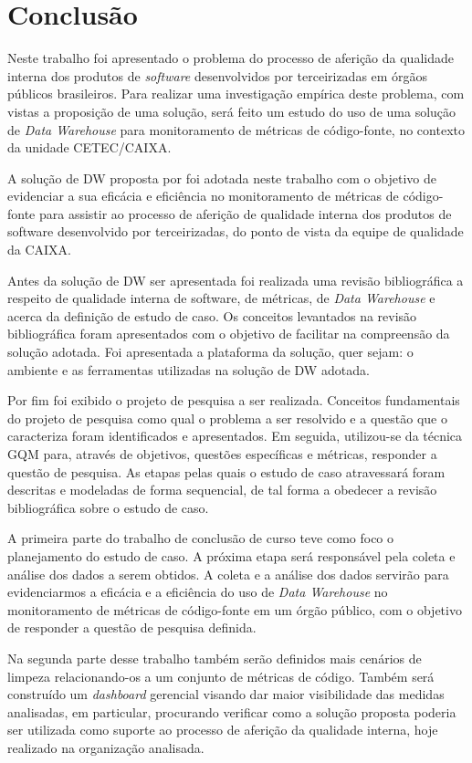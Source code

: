 \chapter{Conclusão}

Neste trabalho foi apresentado o problema do processo de aferição da qualidade interna dos produtos de \textit{software} desenvolvidos por terceirizadas em órgãos públicos brasileiros. Para realizar uma investigação empírica deste problema, com vistas a proposição de uma solução, será feito um estudo do uso de uma solução de \textit{Data Warehouse} para monitoramento de métricas de código-fonte, no contexto da unidade CETEC/CAIXA.

A solução de DW proposta por  foi adotada neste trabalho com o objetivo de evidenciar a sua eficácia e eficiência no monitoramento de métricas de código-fonte para assistir ao processo de aferição de qualidade interna dos produtos de software desenvolvido por terceirizadas, do ponto de vista da equipe de qualidade da CAIXA. 

Antes da solução de DW ser apresentada foi realizada uma revisão bibliográfica a respeito de qualidade interna de software, de métricas, de \textit{Data Warehouse} e acerca da definição de estudo de caso. Os conceitos levantados na revisão bibliográfica foram apresentados com o objetivo de facilitar na compreensão da solução adotada. Foi apresentada a plataforma da solução, quer sejam: o ambiente e as ferramentas utilizadas na solução de DW adotada. 

Por fim foi  exibido o projeto de pesquisa a ser realizada. Conceitos fundamentais do projeto de pesquisa como qual o problema a ser resolvido e a questão que o caracteriza foram identificados e apresentados. Em seguida, utilizou-se da  técnica GQM para, através de objetivos, questões específicas e métricas, responder a questão de pesquisa. As etapas pelas quais o estudo de caso atravessará foram descritas e modeladas de forma sequencial, de tal forma a obedecer a revisão bibliográfica sobre o estudo de caso.

A primeira parte do trabalho de conclusão de curso teve como foco o planejamento do estudo de caso. A próxima etapa será responsável pela coleta e análise dos dados a serem obtidos. A coleta e a análise dos dados servirão para evidenciarmos a eficácia e a eficiência do uso de \textit{Data Warehouse} no monitoramento de métricas de código-fonte em um órgão público, com o objetivo de responder a questão de pesquisa definida.

Na segunda parte desse trabalho também serão definidos mais cenários de limpeza relacionando-os a um conjunto de métricas de código. Também será construído um \textit{dashboard} gerencial visando dar maior visibilidade das medidas analisadas, em particular, procurando verificar como a solução proposta poderia ser utilizada como suporte ao processo de aferição da qualidade interna, hoje realizado na organização analisada.